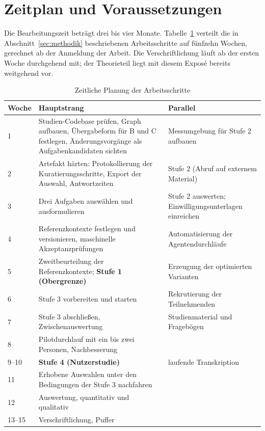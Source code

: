
\section{Zeitplan und Voraussetzungen}
\label{sec:zeitplan}

Die Bearbeitungszeit beträgt drei bis vier Monate. Tabelle~\ref{tab:zeitplan} verteilt die in Abschnitt~\ref{sec:methodik} beschriebenen Arbeitsschritte auf fünfzehn Wochen, gerechnet ab der Anmeldung der Arbeit. Die Verschriftlichung läuft ab der ersten Woche durchgehend mit; der Theorieteil liegt mit diesem Exposé bereits weitgehend vor.

\begin{table}[ht]
  \centering
  \small
  \begin{tabularx}{\textwidth}{@{}p{1.1cm}Xp{5.2cm}@{}}
    \toprule
    Woche & Hauptstrang & Parallel \\
    \midrule
    1 & Studien-Codebase prüfen, Graph aufbauen, Übergabeform für B und C festlegen, Änderungsvorgänge als Aufgabenkandidaten sichten & Messumgebung für Stufe 2 aufbauen \\
    2 & Artefakt härten: Protokollierung der Kuratierungsschritte, Export der Auswahl, Antwortzeiten & Stufe 2 (Abruf auf externem Material) \\
    3 & Drei Aufgaben auswählen und ausformulieren & Stufe 2 auswerten; Einwilligungsunterlagen einreichen \\
    4 & Referenzkontexte festlegen und versionieren, maschinelle Akzeptanzprüfungen & Automatisierung der Agentendurchläufe \\
    5 & Zweitbeurteilung der Referenzkontexte; \textbf{Stufe 1 (Obergrenze)} & Erzeugung der optimierten Varianten \\
    6 & Stufe 3 vorbereiten und starten & Rekrutierung der Teilnehmenden \\
    7 & Stufe 3 abschließen, Zwischenauswertung & Studienmaterial und Fragebögen \\
    8 & Pilotdurchlauf mit ein bis zwei Personen, Nachbesserung & \\
    9--10 & \textbf{Stufe 4 (Nutzerstudie)} & laufende Transkription \\
    11 & Erhobene Auswahlen unter den Bedingungen der Stufe 3 nachfahren & \\
    12 & Auswertung, quantitativ und qualitativ & \\
    13--15 & Verschriftlichung, Puffer & \\
    \bottomrule
  \end{tabularx}
  \caption{Zeitliche Planung der Arbeitsschritte}
  \label{tab:zeitplan}
\end{table}

